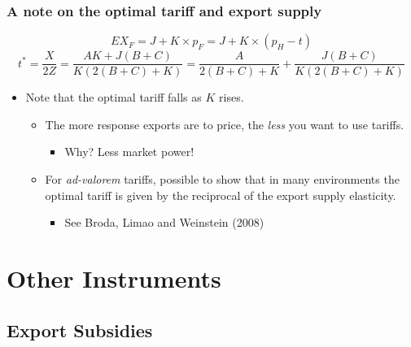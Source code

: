 \documentclass{beamer}
\begin{document}
\begin{frame}
	\frametitle{A note on the optimal tariff and export supply}
\footnotesize
\begin{center}
		\begin{equation}
		EX_F = J + K\times p_F=J + K\times (p_H-t) \nonumber
		\end{equation}
	\begin{equation}
	 t^*= \frac{X}{2Z}=\frac{AK+J(B+C)}{K(2(B+C)+K)} =\frac{A}{2(B+C)+K}+\frac{J(B+C)}{K(2(B+C)+K)} \nonumber
	\end{equation}
\end{center}

\begin{itemize}
	\item Note that the optimal tariff falls as $K$ rises.
		\begin{itemize}
			\item The more response exports are to price, the \emph{less} you want to use tariffs.
				\begin{itemize}
					\item Why? Less market power!
				\end{itemize}
			\item For \emph{ad-valorem} tariffs, possible to show that in many environments the optimal tariff is given by the reciprocal of the export supply elasticity.
				\begin{itemize}
					\item See Broda, Limao and Weinstein (2008)
				\end{itemize} 
		\end{itemize}
\end{itemize}
	
	
	
\end{frame}

\section{Other Instruments}

\subsection{Export Subsidies}
\end{document}
